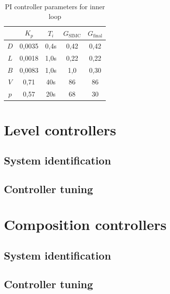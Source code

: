 \documentclass[12pt]{article}
\begin{document}
\begin{table}
\centering
\begin{tabular}{c | c | c | c | c}
& $K_p$ & $T_i$ & $G_{\textrm{SIMC}}$ & $G_{\textrm{final}}$ \\ \hline
$D$ & 0,0035 & 0,4s & 0,42 & 0,42\\
$L$ & 0,0018 & 1,0s & 0,22 & 0,22\\
$B$ & 0,0083 & 1,0s & 1,0 & 0,30 \\
$V$ & 0,71 & 40s & 86 & 86 \\
$p$ & 0,57 & 20s & 68 & 30
\end{tabular}
\caption{PI controller parameters for inner loop}
\label{tab:inner_loop_PI_parameters}
\end{table}


\newpage
\section{Level controllers}
\subsection{System identification}
\subsection{Controller tuning}

\newpage
\section{Composition controllers}
\subsection{System identification}
\subsection{Controller tuning}
\end{document}

